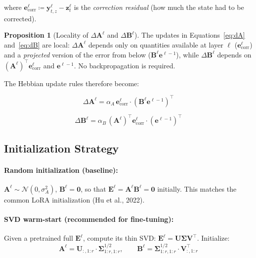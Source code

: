 \documentclass[11pt]{article}
\theoremstyle{definition}
\newtheorem{proposition}{Proposition}[section]
\newcommand{\vz}{\mathbf{z}}
\newcommand{\vy}{\mathbf{y}}
\newcommand{\ve}{\mathbf{e}}
\newcommand{\E}{\mathbf{E}}
\newcommand{\A}{\mathbf{A}}
\newcommand{\B}{\mathbf{B}}
\newcommand{\mU}{\mathbf{U}}
\newcommand{\mS}{\mathbf{\Sigma}}
\newcommand{\mV}{\mathbf{V}}
\begin{document}
where $\ve^\ell_\text{corr} \coloneqq \vy^\ell_{t,z} - \vz^\ell_t$ is the
\emph{correction residual} (how much the state had to be corrected).

\begin{proposition}[Locality of $\Delta\A^\ell$ and $\Delta\B^\ell$]
The updates in Equations~\eqref{eq:dA} and~\eqref{eq:dB} are local: $\Delta\A^\ell$
depends only on quantities available at layer $\ell$ ($\ve^\ell_\text{corr}$) and
a \emph{projected} version of the error from below ($\B^\ell \ve^{\ell-1}$), while
$\Delta\B^\ell$ depends on $(\A^\ell)^\top \ve^\ell_\text{corr}$ and $\ve^{\ell-1}$.
No backpropagation is required.
\end{proposition}

The Hebbian update rules therefore become:

\begin{equation}
  \boxed{
  \Delta \A^\ell = \alpha_A \, \ve^\ell_\text{corr} \cdot \left(\B^\ell \ve^{\ell-1}\right)^\top
  }
\end{equation}

\begin{equation}
  \boxed{
  \Delta \B^\ell = \alpha_B \, \left(\A^\ell\right)^\top \ve^\ell_\text{corr} \cdot \left(\ve^{\ell-1}\right)^\top
  }
\end{equation}

\subsection{Initialization Strategy}

\paragraph{Random initialization (baseline):}
$\A^\ell \sim \mathcal{N}(0, \sigma^2_A)$,
$\B^\ell = \mathbf{0}$, so that $\E^\ell = \A^\ell \B^\ell = \mathbf{0}$ initially.
This matches the common LoRA initialization (Hu et al., 2022).

\paragraph{SVD warm-start (recommended for fine-tuning):}
Given a pretrained full $\E^\ell$, compute its thin SVD:
$\E^\ell = \mU \mS \mV^\top$. Initialize:
\begin{equation}
  \A^\ell = \mU_{:, 1:r} \cdot \mS^{1/2}_{1:r,1:r}, \qquad
  \B^\ell = \mS^{1/2}_{1:r,1:r} \cdot \mV^\top_{:, 1:r}
\end{equation}
\end{document}
